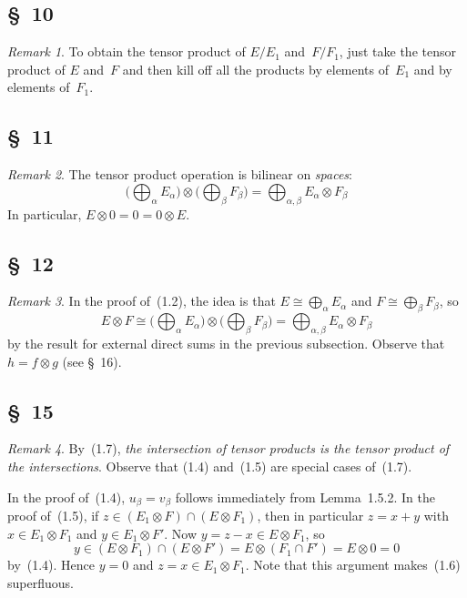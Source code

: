 \documentclass[letterpaper,12pt]{article}
\newcommand{\iso}{\cong}
\newcommand{\sect}{\cap}
\newcommand{\bigdsum}{\bigoplus}
\newcommand{\tprod}{\otimes}
\theoremstyle{definition}
\theoremstyle{remark}
\newtheorem*{rmk}{Remark}
\begin{document}
\subsection*{\S~10}
\begin{rmk}
To obtain the tensor product of \(E/E_1\) and~\(F/F_1\), just take the tensor product of \(E\) and~\(F\) and then kill off all the products by elements of~\(E_1\) and by elements of~\(F_1\).
\end{rmk}

\subsection*{\S~11}
\begin{rmk}
The tensor product operation is bilinear on \emph{spaces}:
\[\bigl(\bigdsum_{\alpha}E_{\alpha}\bigr)\tprod\bigl(\bigdsum_{\beta}F_{\beta}\bigr)=\bigdsum_{\alpha,\beta}E_{\alpha}\tprod F_{\beta}\]
In particular, \(E\tprod 0=0=0\tprod E\).
\end{rmk}

\subsection*{\S~12}
\begin{rmk}
In the proof of~(1.2), the idea is that \(E\iso\bigdsum_{\alpha}E_{\alpha}\) and \(F\iso\bigdsum_{\beta}F_{\beta}\), so
\[E\tprod F\iso\bigl(\bigdsum_{\alpha}E_{\alpha}\bigr)\tprod\bigl(\bigdsum_{\beta}F_{\beta}\bigr)=\bigdsum_{\alpha,\beta}E_{\alpha}\tprod F_{\beta}\]
by the result for external direct sums in the previous subsection. Observe that \(h=f\tprod g\) (see \S~16).
\end{rmk}

\subsection*{\S~15}
\begin{rmk}
By~(1.7), \emph{the intersection of tensor products is the tensor product of the intersections}. Observe that (1.4) and~(1.5) are special cases of~(1.7).

In the proof of~(1.4), \(u_{\beta}=v_{\beta}\) follows immediately from Lemma~1.5.2. In the proof of~(1.5), if \(z\in(E_1\tprod F)\sect(E\tprod F_1)\), then in particular \(z=x+y\) with \(x\in E_1\tprod F_1\) and \(y\in E_1\tprod F'\). Now \(y=z-x\in E\tprod F_1\), so
\[y\in(E\tprod F_1)\sect(E\tprod F')=E\tprod(F_1\sect F')=E\tprod 0=0\]
by~(1.4). Hence \(y=0\) and \(z=x\in E_1\tprod F_1\). Note that this argument makes~(1.6) superfluous.
\end{rmk}
\end{document}
